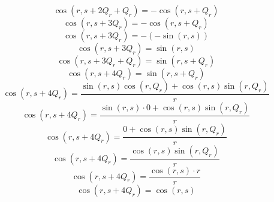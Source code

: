 \documentclass[a4paper,12pt]{report}
\begin{document}
\begin{equation}
\cos(r,s + 2Q_r + Q_r) = -\cos(r,s + Q_r)
\end{equation}
\begin{equation}
\cos(r,s + 3Q_r) = -\cos(r,s + Q_r)
\end{equation}
\begin{equation}
\cos(r,s + 3Q_r) = -(-\sin(r,s))
\end{equation}
\begin{equation}
\cos(r,s + 3Q_r) = \sin(r,s)
\end{equation}
\begin{equation}
\cos(r,s + 3Q_r + Q_r) = \sin(r,s + Q_r)
\end{equation}
\begin{equation}
\cos(r,s + 4Q_r) = \sin(r,s + Q_r)
\end{equation}
\begin{equation}
\cos(r,s + 4Q_r) = \frac{\sin(r,s) \cos(r,Q_r) + \cos(r,s) \sin(r,Q_r)}{r}
\end{equation}
\begin{equation}
\cos(r,s + 4Q_r) = \frac{\sin(r,s) \cdot 0 + \cos(r,s) \sin(r,Q_r)}{r}
\end{equation}
\begin{equation}
\cos(r,s + 4Q_r) = \frac{0 + \cos(r,s) \sin(r,Q_r)}{r}
\end{equation}
\begin{equation}
\cos(r,s + 4Q_r) = \frac{\cos(r,s) \sin(r,Q_r)}{r}
\end{equation}
\begin{equation}
\cos(r,s + 4Q_r) = \frac{\cos(r,s) \cdot r}{r}
\end{equation}
\begin{equation}
\cos(r,s + 4Q_r) = \cos(r,s)
\end{equation}
\end{document}
